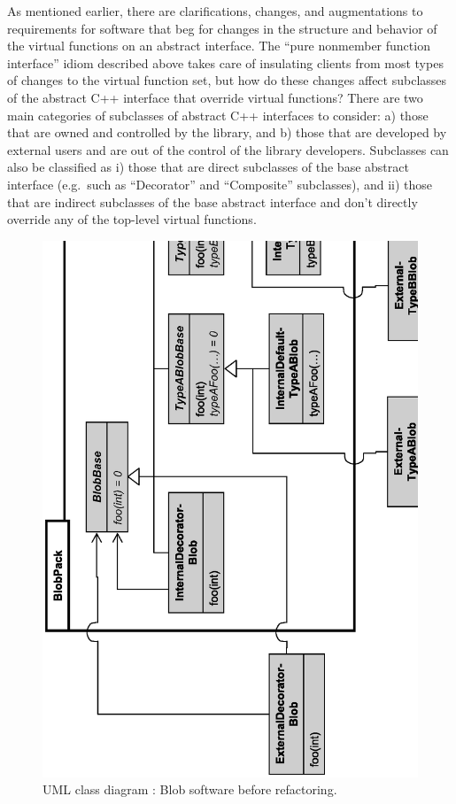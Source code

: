 \documentclass[pdf,ps2pdf,11pt]{SANDreport}
\begin{document}
As mentioned earlier, there are clarifications, changes, and augmentations to
requirements for software that beg for changes in the structure and behavior
of the virtual functions on an abstract interface.  The ``pure nonmember
function interface'' idiom described above takes care of insulating clients
from most types of changes to the virtual function set, but how do these
changes affect subclasses of the abstract C++ interface that override virtual
functions?  There are two main categories of subclasses of abstract C++
interfaces to consider: a) those that are owned and controlled by the library,
and b) those that are developed by external users and are out of the control
of the library developers.  Subclasses can also be classified as i) those that
are direct subclasses of the base abstract interface (e.g.\ such as
``Decorator'' and ``Composite'' subclasses), and ii) those that are indirect
subclasses of the base abstract interface and don't directly override any of
the top-level virtual functions.

{\bsinglespace
\begin{figure}
\begin{center}
\includegraphics*[angle=270,scale=0.55
]{BlobBaseBeforeRefactoring}
\end{center}
\caption{
\label{fig:BlobBaseBeforeRefactoring}
UML class diagram : Blob software before refactoring.  }
\end{figure}
\esinglespace}
\end{document}
